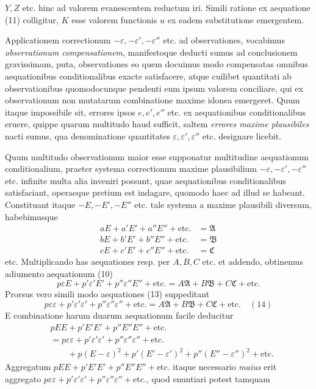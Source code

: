 \(Y,Z\) etc. hinc ad valorem evanescentem reductum iri. Simili ratione ex aequatione (11) colligitur, \(K\) esse valorem functionis \(u\) ex eadem substitutione emergentem.

Applicationem correctionum \(-\varepsilon,-\varepsilon',-\varepsilon''\) etc. ad observationes, vocabimus \textit{observationum compensationem}, manifestoque deducti sumus ad conclusionem gravissimam, puta, observationes eo quem docuimus modo compensatas omnibus aequationibus conditionalibus exacte satisfacere, atque cuilibet quantitati ab observationibus quomodocunque pendenti eum ipsum valorem conciliare, qui ex observationum non mutatarum combinatione maxime idonea emergeret. Quum itaque impossibile sit, errores ipsos \(e,e',e''\) etc. ex aequationibus conditionalibus eruere, quippe quarum multitudo haud sufficit, saltem \textit{errores maxime plausibiles} nacti sumus, qua denominatione quantitates \(\varepsilon,\varepsilon',\varepsilon''\) etc. designare licebit.

Quum multitudo observationum maior esse supponatur multitudine aequationum conditionalium, praeter systema correctionum maxime plausibilium \(-\varepsilon,-\varepsilon',-\varepsilon''\) etc. infinite multa alia inveniri possunt, quae aequationibus conditionalibus satisfaciant, operaeque pretium est indagare, quomodo haec ad illud se habeant. Constituant itaque \(-E,-E',-E''\) etc. tale systema a maxime plausibili diversum, habebimusque
\[
\begin{aligned}
aE+a'E'+a''E''+\text{etc.}&=\mathfrak A\\
bE+b'E'+b''E''+\text{etc.}&=\mathfrak B\\
cE+c'E'+c''E''+\text{etc.}&=\mathfrak C
\end{aligned}
\]
etc. Multiplicando has aequationes resp. per \(A,B,C\) etc. et addendo, obtinemus adiumento aequationum (10)
\[
p\varepsilon E+p'\varepsilon'E'+p''\varepsilon''E''+\text{etc.}=A\mathfrak A+B\mathfrak B+C\mathfrak C+\text{etc.}
\]
Prorsus vero simili modo aequationes (13) suppeditant
\[
p\varepsilon\varepsilon+p'\varepsilon'\varepsilon'+p''\varepsilon''\varepsilon''+\text{etc.}=A\mathfrak A+B\mathfrak B+C\mathfrak C+\text{etc.}\quad(14)
\]
E combinatione harum duarum aequationum facile deducitur
\[
\begin{aligned}
&pEE+p'E'E'+p''E''E''+\text{etc.}\\
&=p\varepsilon\varepsilon+p'\varepsilon'\varepsilon'+p''\varepsilon''\varepsilon''+\text{etc.}
\\&\qquad+p(E-\varepsilon)^2+p'(E'-\varepsilon')^2+p''(E''-\varepsilon'')^2+\text{etc.}
\end{aligned}
\]
Aggregatum \(pEE+p'E'E'+p''E''E''+\text{etc.}\) itaque necessario \textit{maius} erit aggregato \(p\varepsilon\varepsilon+p'\varepsilon'\varepsilon'+p''\varepsilon''\varepsilon''+\text{etc.}\), quod enuntiari potest tamquam

